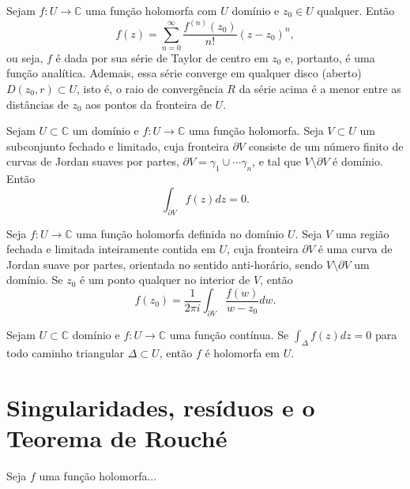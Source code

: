 \begin{teorema}
Sejam $f:U\to\mathbb{C}$ uma função holomorfa com $U$ domínio e $z_0\in U$ qualquer.
Então
\begin{equation*}
    f(z) = \sum_{n=0}^{\infty} \frac{f^{(n)}(z_0)}{n!}(z-z_0)^n,
\end{equation*}
ou seja, $f$ é dada por sua série de Taylor de centro em $z_0$ e, portanto, é uma função analítica.
Ademais, essa série converge em qualquer disco (aberto) $D(z_0, r) \subset U$, isto é, o raio de convergência $R$ da série acima é a menor entre as distâncias de $z_0$ aos pontos da fronteira de $U$.
\end{teorema}


\begin{teorema}
\label{teo-cauchy}
Sejam $U\subset\mathbb{C}$ um domínio e $f:U\to\mathbb{C}$ uma função holomorfa. Seja $V\subset U$ um subconjunto fechado e limitado, cuja fronteira $\partial V$ consiste de um número finito de curvas de Jordan
suaves por partes, $\partial V = \gamma_1\cup\cdots\gamma_n$, e tal que
$V\setminus\partial V$ é domínio. Então
\begin{equation*}
    \int_{\partial V} f(z) dz = 0.
\end{equation*}
\end{teorema}

\begin{teorema}
Seja $f:U\to\mathbb{C}$ uma função holomorfa definida no domínio $U$. Seja $V$ uma região fechada e limitada inteiramente contida em $U$, 
cuja fronteira $\partial V$ é uma curva de Jordan suave por partes, orientada no sentido anti-horário, sendo $V\setminus\partial V$ um domínio.
Se $z_0$ é um ponto qualquer no interior de $V$, então
\begin{equation*}
    f(z_0) = \frac{1}{2\pi i}\int_{\partial V} \frac{f(w)}{w-z_0} dw.
\end{equation*}
\end{teorema}


\begin{teorema}
\label{teo-morera}
Sejam $U\subset\mathbb{C}$ domínio e $f:U\to\mathbb{C}$ uma função contínua.
Se $\int_{\Delta} f(z) dz = 0$ para todo caminho triangular $\Delta\subset U$, então $f$ é holomorfa em $U$.
\end{teorema}


\section[Singularidades, resíduos e o Teorema de Rouché]{Singularidades, resíduos e o Teorema de Rouché}

\begin{teorema}
\label{teo-laurent}
Seja $f$ uma função holomorfa...
\end{teorema}